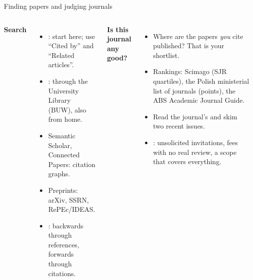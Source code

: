 \documentclass[aspectratio=169,11pt,t]{beamer}
\begin{document}
\begin{frame}{Finding papers and judging journals}
  \begin{columns}[T,onlytextwidth]
    \textbf{Search}
    \begin{itemize}
      \item {}: start here; use ``Cited by'' and ``Related articles''.
      \item {}: through the University Library (BUW), also from home.
      \item Semantic Scholar, Connected Papers: citation graphs.
      \item Preprints: arXiv, SSRN, RePEc/IDEAS.
      \item {}: backwards through references, forwards through citations.
    \end{itemize}
    \textbf{Is this journal any good?}
    \begin{itemize}
      \item Where are the papers \emph{you} cite published? That is your shortlist.
      \item Rankings: Scimago (SJR quartiles), the Polish ministerial list of journals (points),
            the ABS Academic Journal Guide.
      \item Read the journal's  and skim two recent issues.
      \item {}: unsolicited invitations, fees with no real review,
            a scope that covers everything.
    \end{itemize}
  \end{columns}
\end{frame}
\end{document}

